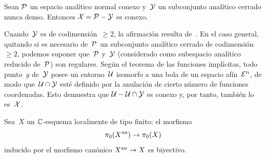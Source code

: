 \begin{lemme}
\label{XII.2.5}
Sean
$\cal{P}$ un espacio analítico normal conexo y~$\cal{Y}$ un subconjunto
analítico cerrado nunca denso. Entonces $\cal{X}=\cal{P}-\cal{Y}$ es conexo.
\end{lemme}

Cuando~$\cal{Y}$ es de codimensión~$\geq2$, la afirmación resulta
de~\cite[~prop]{XII.11}. En el caso general, quitando si es
necesario de~$\cal{P}$ un subconjunto analítico cerrado de
codimensión~$\geq2$, podemos suponer que~$\cal{P}$ y~$\cal{Y}$ (considerado
como subespacio analítico reducido de~$\cal{P}$) son regulares. Según el
teorema de las funciones implícitas, todo punto~$y$ de~$\cal{Y}$ posee un
entorno~$\cal{U}$ isomorfo a una bola de un espacio afín~$\cal{E}^{n}$, de modo
que~$\cal{U}\cap\cal{Y}$ esté definido por la anulación de cierto número de
funciones coordenadas. Esto demuestra que
$\cal{U}-\cal{U}\cap\cal{Y}$ es conexo y, por tanto, también lo
es~$\cal{X}$.

\begin{corollaire}
\label{XII.2.6}
Sea~$X$ un $\CC$-esquema localmente de tipo finito; el morfismo
$$
\pi_0(X^{\an})\to\pi_0(X)
$$
inducido por el morfismo canónico $X^\an\to X$ es biyectivo.
\end{corollaire}
